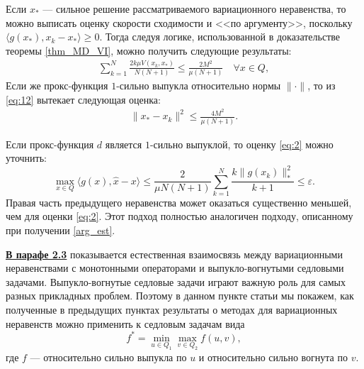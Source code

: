 \begin{remark}
    Если $x_*$ --- сильное решение рассматриваемого вариационного не\-равенства, то можно выписать оценку скорости сходимости и <<по аргументу>>, поскольку $\langle g(x_*), x_k - x_*\rangle \geq 0$. Тогда следуя логике, использованной в доказательстве теоремы \ref{thm_MD_VI}, можно получить следующие результаты: 
        \begin{equation} \label{eq:12}
        \begin{aligned} 
            \sum_{k=1}^{N} \frac{2k\mu V(x_k, x_*)}{N(N+1)} \leq \frac{2M^2}{\mu(N+1)} \quad  \forall x \in Q,
        \end{aligned}
        \end{equation}
    Если же прокс-функция $1$-сильно выпукла относительно нормы $\|\cdot\|$, то из \eqref{eq:12} вытекает следующая оценка:
        \begin{equation} 
        \begin{aligned} 
            \|x_* - x_k\|^2 \leq \frac{4M^2}{\mu(N+1)}.
        \end{aligned}
        \end{equation}
\end{remark}
\begin{remark}
    Если прокс-функция $d$ является $1$-сильно выпуклой, то оценку \eqref{eq:2} можно уточнить:
    \begin{equation}
        \max_{x \in Q} \langle g(x), \widehat{x} - x \rangle \leq \frac{2}{\mu N (N+1)} \sum_{k=1}^{N} \frac{k \|g(x_k)\|_*^2}{k+1} \leq \varepsilon.
    \end{equation}
    Правая часть предыдущего неравенства может оказаться существенно меньшей, чем для оценки \eqref{eq:2}. Этот подход полностью аналогичен подходу, описанному при получении \eqref{arg_est}.
\end{remark}

\underline{\textbf{В парафе 2.3}} показывается естественная взаимосвязь между вариационными неравенствами с монотонными операторами и выпукло-вогнутыми седловыми задачами. Выпукло-вогнутые седловые задачи играют важную роль для самых разных прикладных проблем. Поэтому в данном пункте статьи мы покажем, как полученные в предыдущих пунктах результаты о методах для вариационных неравенств можно применить к седловым задачам вида
\begin{equation}\label{eqsedlo}
    f^* = \min_{u \in Q_1} \max_{v \in Q_2} f(u, v),
\end{equation}
где $f$ --- относительно сильно выпукла по $u$ и относительно сильно вогнута по $v$.

